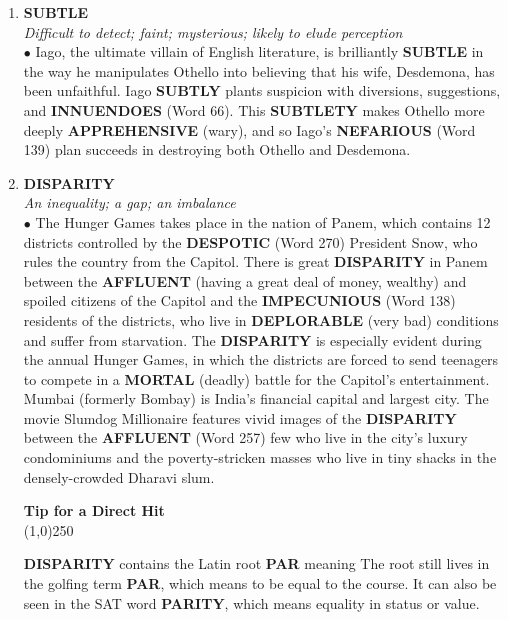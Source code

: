 \documentclass{book}
\begin{document}
\begin{enumerate}
\item \textbf{SUBTLE}\\
\textit{ Difficult to detect; faint; mysterious; likely to elude perception}\\

$ \bullet $ Iago, the ultimate villain of English literature, is brilliantly \textbf{SUBTLE} in the way he manipulates Othello into believing that his wife, Desdemona, has been unfaithful. Iago \textbf{SUBTLY} plants suspicion with diversions, suggestions, and \textbf{INNUENDOES} (Word 66). This \textbf{SUBTLETY} makes Othello more deeply \textbf{APPREHENSIVE} (wary), and so Iago's \textbf{NEFARIOUS} (Word 139) plan succeeds in destroying both Othello and Desdemona.

\item \textbf{DISPARITY}\\
 \textit{An inequality; a gap; an imbalance}\\
 
$ \bullet $  The Hunger Games takes place in the nation of Panem, which contains 12 districts controlled by the \textbf{DESPOTIC} (Word 270) President Snow, who rules the country from the Capitol. There is great \textbf{DISPARITY} in Panem between the \textbf{AFFLUENT} (having a great deal of money, wealthy) and spoiled citizens of the Capitol and the \textbf{IMPECUNIOUS} (Word 138) residents of the districts, who live in \textbf{DEPLORABLE} (very bad) conditions and suffer from starvation. The \textbf{DISPARITY} is especially evident during the annual Hunger Games, in which the districts are forced to send teenagers to compete in a \textbf{MORTAL} (deadly) battle for the Capitol's entertainment. Mumbai (formerly Bombay) is India's financial capital and largest city. The movie Slumdog Millionaire features vivid images of the \textbf{DISPARITY} between the \textbf{AFFLUENT} (Word 257) few who live in the city's luxury condominiums and the poverty-stricken masses who live in tiny shacks in the densely-crowded Dharavi slum. 
\begin{tcolorbox}
\begin{center}
 \textbf{Tip for a Direct Hit}\\
\line(1,0){250}\\
\end{center}
\textbf{DISPARITY} contains the Latin root \textbf{PAR} meaning  The root still lives in the golfing term \textbf{PAR}, which means to be equal to the course. It can also be seen in the SAT word \textbf{PARITY}, which means equality in status or value.  
\end{tcolorbox}  


\end{enumerate}
\end{document}
